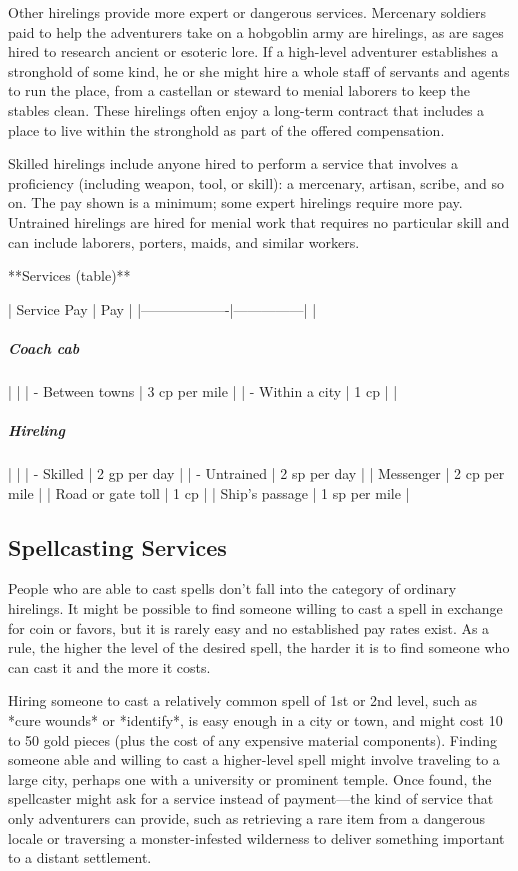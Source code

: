 Other hirelings provide more expert or dangerous services. Mercenary soldiers paid to help the adventurers take on a hobgoblin army are hirelings, as are sages hired to research ancient or esoteric lore. If a high-level adventurer establishes a stronghold of some kind, he or she might hire a whole staff of servants and agents to run the place, from a castellan or steward to menial laborers to keep the stables clean. These hirelings often enjoy a long-term contract that includes a place to live within the stronghold as part of the offered compensation.

Skilled hirelings include anyone hired to perform a service that involves a proficiency (including weapon, tool, or skill): a mercenary, artisan, scribe, and so on. The pay shown is a minimum; some expert hirelings require more pay. Untrained hirelings are hired for menial work that requires no particular skill and can include laborers, porters, maids, and similar workers.

**Services (table)**

| Service Pay       | Pay           |
|-------------------|---------------|
| \subparagraph*{Coach cab}   |               |
| - Between towns   | 3 cp per mile |
| - Within a city   | 1 cp          |
| \subparagraph*{Hireling}    |               |
| - Skilled         | 2 gp per day  |
| - Untrained       | 2 sp per day  |
| Messenger         | 2 cp per mile |
| Road or gate toll | 1 cp          |
| Ship's passage    | 1 sp per mile |

\subsection{Spellcasting Services}

People who are able to cast spells don't fall into the category of ordinary hirelings. It might be possible to find someone willing to cast a spell in exchange for coin or favors, but it is rarely easy and no established pay rates exist. As a rule, the higher the level of the desired spell, the harder it is to find someone who can cast it and the more it costs.

Hiring someone to cast a relatively common spell of 1st or 2nd level, such as *cure wounds* or *identify*, is easy enough in a city or town, and might cost 10 to 50 gold pieces (plus the cost of any expensive material components). Finding someone able and willing to cast a higher-level spell might involve traveling to a large city, perhaps one with a university or prominent temple. Once found, the spellcaster might ask for a service instead of payment—the kind of service that only adventurers can provide, such as retrieving a rare item from a dangerous locale or traversing a monster-infested wilderness to deliver something important to a distant settlement.
